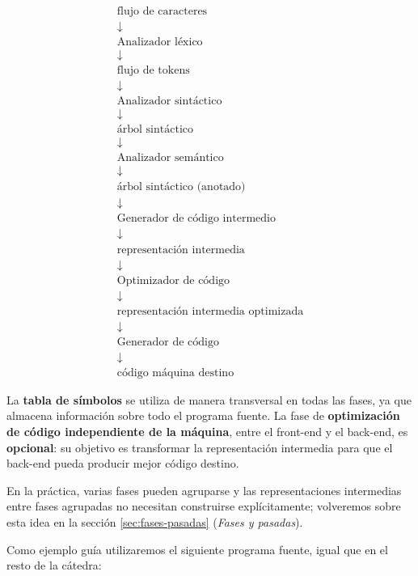 \documentclass[11pt,a4paper]{article}
\begin{document}
\[
\begin{array}{c}
\text{flujo de caracteres} \\
\downarrow \\
\boxed{\text{Analizador léxico}} \\
\downarrow \\
\text{flujo de tokens} \\
\downarrow \\
\boxed{\text{Analizador sintáctico}} \\
\downarrow \\
\text{árbol sintáctico} \\
\downarrow \\
\boxed{\text{Analizador semántico}} \\
\downarrow \\
\text{árbol sintáctico (anotado)} \\
\downarrow \\
\boxed{\text{Generador de código intermedio}} \\
\downarrow \\
\text{representación intermedia} \\
\downarrow \\
\boxed{\text{Optimizador de código}} \\
\downarrow \\
\text{representación intermedia optimizada} \\
\downarrow \\
\boxed{\text{Generador de código}} \\
\downarrow \\
\text{código máquina destino}
\end{array}
\]

La \textbf{tabla de símbolos} se utiliza de manera transversal en todas las fases, ya que
almacena información sobre todo el programa fuente. La fase de \textbf{optimización de código
independiente de la máquina}, entre el front-end y el back-end, es \textbf{opcional}: su
objetivo es transformar la representación intermedia para que el back-end pueda producir mejor
código destino.

En la práctica, varias fases pueden agruparse y las representaciones intermedias entre fases
agrupadas no necesitan construirse explícitamente; volveremos sobre esta idea en la sección
\ref{sec:fases-pasadas} (\textit{Fases y pasadas}).

Como ejemplo guía utilizaremos el siguiente programa fuente, igual que en el resto de la
cátedra:
\end{document}
